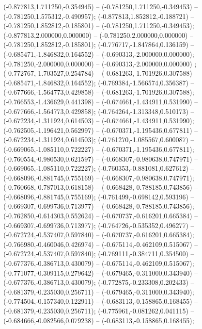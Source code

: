  (-0.877813,1.711250,-0.354945) -- (-0.781250,1.711250,-0.349453) -- (-0.781250,1.575312,-0.490957);
 (-0.877813,1.852812,-0.188721) -- (-0.781250,1.852812,-0.185801) -- (-0.781250,1.711250,-0.349453);
 (-0.877813,2.000000,0.000000) -- (-0.781250,2.000000,0.000000) -- (-0.781250,1.852812,-0.185801);
 (-0.776717,-1.847864,0.136159) -- (-0.685471,-1.846832,0.164552) -- (-0.690313,-2.000000,0.000000);
 (-0.781250,-2.000000,0.000000) -- (-0.690313,-2.000000,0.000000) ;
 (-0.772767,-1.703527,0.254784) -- (-0.681263,-1.701926,0.307588) -- (-0.685471,-1.846832,0.164552);
 (-0.769384,-1.566574,0.356387) -- (-0.677666,-1.564773,0.429858) -- (-0.681263,-1.701926,0.307588);
 (-0.766553,-1.436629,0.441398) -- (-0.674661,-1.434911,0.531990) -- (-0.677666,-1.564773,0.429858);
 (-0.764264,-1.313348,0.510173) -- (-0.672234,-1.311924,0.614503) -- (-0.674661,-1.434911,0.531990);
 (-0.762505,-1.196421,0.562997) -- (-0.670371,-1.195436,0.677811) -- (-0.672234,-1.311924,0.614503);
 (-0.761270,-1.085567,0.600087) -- (-0.669065,-1.085110,0.722227) -- (-0.670371,-1.195436,0.677811);
 (-0.760554,-0.980530,0.621597) -- (-0.668307,-0.980638,0.747971) -- (-0.669065,-1.085110,0.722227);
 (-0.760353,-0.881081,0.627612) -- (-0.668096,-0.881745,0.755169) -- (-0.668307,-0.980638,0.747971);
 (-0.760668,-0.787013,0.618158) -- (-0.668428,-0.788185,0.743856) -- (-0.668096,-0.881745,0.755169);
 (-0.761499,-0.698142,0.593196) -- (-0.669307,-0.699736,0.713977) -- (-0.668428,-0.788185,0.743856);
 (-0.762850,-0.614303,0.552624) -- (-0.670737,-0.616201,0.665384) -- (-0.669307,-0.699736,0.713977);
 (-0.764726,-0.535352,0.496277) -- (-0.672724,-0.537407,0.597840) -- (-0.670737,-0.616201,0.665384);
 (-0.766980,-0.460046,0.426974) -- (-0.675114,-0.462109,0.515067) -- (-0.672724,-0.537407,0.597840);
 (-0.769111,-0.384711,0.354500) -- (-0.677376,-0.386713,0.430079) -- (-0.675114,-0.462109,0.515067);
 (-0.771077,-0.309115,0.279642) -- (-0.679465,-0.311000,0.343940) -- (-0.677376,-0.386713,0.430079);
 (-0.772875,-0.233308,0.202433) -- (-0.681379,-0.235030,0.256711) -- (-0.679465,-0.311000,0.343940);
 (-0.774504,-0.157340,0.122911) -- (-0.683113,-0.158865,0.168455) -- (-0.681379,-0.235030,0.256711);
 (-0.775961,-0.081262,0.041115) -- (-0.684666,-0.082566,0.079238) -- (-0.683113,-0.158865,0.168455);
